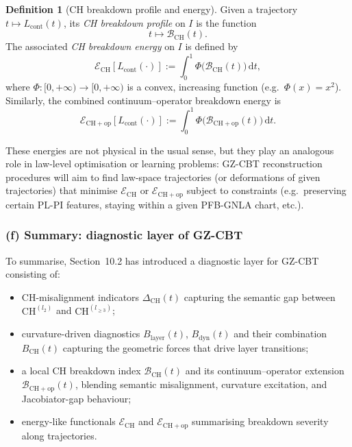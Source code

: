 \documentclass[11pt]{book}
\theoremstyle{plain}
\theoremstyle{definition}
\newtheorem{definition}[theorem]{Definition} \theoremstyle{remark}
\begin{document}
\begin{definition}[CH breakdown profile and energy]
Given a trajectory $t\mapsto L_{\mathrm{cont}}(t)$, its \emph{CH
  breakdown profile} on $I$ is the function
  \[
     t \longmapsto \mathcal{B}_{\mathrm{CH}}(t).
  \]
  The associated \emph{CH breakdown energy} on $I$ is defined by
  \[
     \mathcal{E}_{\mathrm{CH}}[L_{\mathrm{cont}}(\cdot)]
     :=
     \int_0^1
       \Phi\bigl(\mathcal{B}_{\mathrm{CH}}(t)\bigr)\,\mathrm{d}t,
  \]
  where $\Phi:[0,+\infty)\to[0,+\infty)$ is a convex, increasing
  function (e.g.\ $\Phi(x)=x^2$). Similarly, the combined
  continuum--operator breakdown energy is
  \[
     \mathcal{E}_{\mathrm{CH+op}}[L_{\mathrm{cont}}(\cdot)]
     :=
     \int_0^1
       \Phi\bigl(\mathcal{B}_{\mathrm{CH+op}}(t)\bigr)\,\mathrm{d}t.
  \]
\end{definition}

These energies are not physical in the usual sense, but they play an
analogous role in law-level optimisation or learning problems: GZ-CBT
reconstruction procedures will aim to find law-space trajectories (or
deformations of given trajectories) that minimise
$\mathcal{E}_{\mathrm{CH}}$ or $\mathcal{E}_{\mathrm{CH+op}}$ subject
to constraints (e.g.\ preserving certain PL-PI features, staying within
a given PFB-GNLA chart, etc.).



\subsubsection*{(f) Summary: diagnostic layer of GZ-CBT}

To summarise, Section~10.2 has introduced a diagnostic layer for GZ-CBT
consisting of:

\begin{itemize}
  \item CH-misalignment indicators $\Delta_{\mathrm{CH}}(t)$ capturing
        the semantic gap between \\ $\mathrm{CH}^{(l_2)}$ and $\mathrm{CH}^{(l_{\ge3})}$;
  \item curvature-driven diagnostics
        $B_{\mathrm{layer}}(t)$, $B_{\mathrm{dyn}}(t)$ and their
        combination $B_{\mathrm{CH}}(t)$ capturing the geometric forces
        that drive layer transitions;
  \item a local CH breakdown index
        $\mathcal{B}_{\mathrm{CH}}(t)$ and its continuum--operator
        extension $\mathcal{B}_{\mathrm{CH+op}}(t)$, blending semantic
        misalignment, curvature excitation, and Jacobiator-gap
        behaviour;
  \item energy-like functionals
        $\mathcal{E}_{\mathrm{CH}}$ and $\mathcal{E}_{\mathrm{CH+op}}$
        summarising breakdown severity along trajectories.
\end{itemize}
\end{document}
